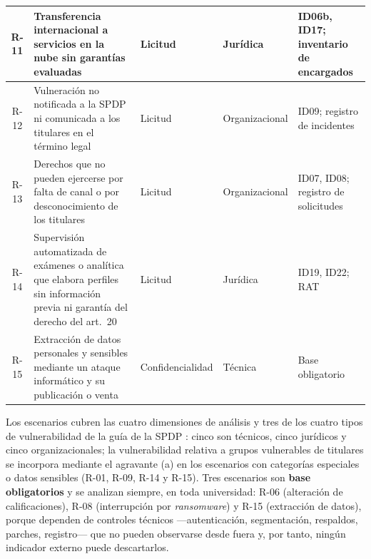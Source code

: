 \begin{table}[htbp]
\begin{tabularx}{\textwidth}{|c|L|>{\raggedright\arraybackslash}p{2.05cm}|>{\raggedright\arraybackslash}p{1.8cm}|>{\raggedright\arraybackslash}p{2.1cm}|}
    R-11 & Transferencia internacional a servicios en la nube sin garantías evaluadas & Licitud & Jurídica & ID06b, ID17; inventario de encargados \\ \hline
    R-12 & Vulneración no notificada a la SPDP ni comunicada a los titulares en el término legal & Licitud & Organizacional & ID09; registro de incidentes \\ \hline
    R-13 & Derechos que no pueden ejercerse por falta de canal o por desconocimiento de los titulares & Licitud & Organizacional & ID07, ID08; registro de solicitudes \\ \hline
    R-14 & Supervisión automatizada de exámenes o analítica que elabora perfiles sin información previa ni garantía del derecho del art.~20 & Licitud & Jurídica & ID19, ID22; RAT \\ \hline
    R-15 & Extracción de datos personales y sensibles mediante un ataque informático y su publicación o venta & Confidencialidad & Técnica & Base obligatorio \\ \hline
  \end{tabularx}
  \raggedright
\end{table}

Los escenarios cubren las cuatro dimensiones de análisis y tres de los cuatro tipos de vulnerabilidad de la guía de la SPDP \cite{spdp2026guiav2}: cinco son técnicos, cinco jurídicos y cinco organizacionales; la vulnerabilidad relativa a grupos vulnerables de titulares se incorpora mediante el agravante (a) en los escenarios con categorías especiales o datos sensibles (R-01, R-09, R-14 y R-15). Tres escenarios son \textbf{base obligatorios} y se analizan siempre, en toda universidad: R-06 (alteración de calificaciones), R-08 (interrupción por \textit{ransomware}) y R-15 (extracción de datos), porque dependen de controles técnicos ---autenticación, segmentación, respaldos, parches, registro--- que no pueden observarse desde fuera y, por tanto, ningún indicador externo puede descartarlos.

